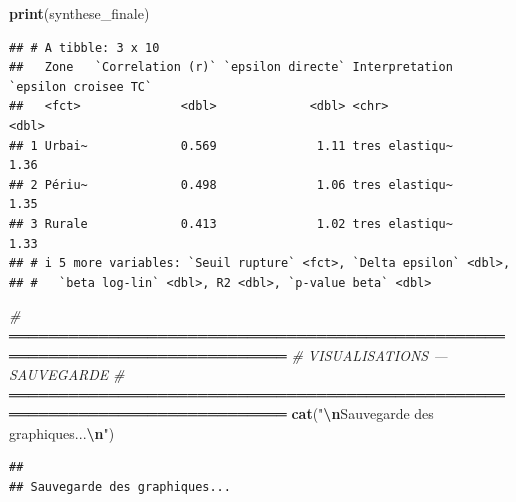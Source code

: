 \documentclass[
]{article}
\newenvironment{Shaded}{\begin{snugshade}}{\end{snugshade}}
\newcommand{\CommentTok}[1]{\textcolor[rgb]{0.56,0.35,0.01}{\textit{#1}}}
\newcommand{\FunctionTok}[1]{\textcolor[rgb]{0.13,0.29,0.53}{\textbf{#1}}}
\newcommand{\NormalTok}[1]{#1}
\newcommand{\SpecialCharTok}[1]{\textcolor[rgb]{0.81,0.36,0.00}{\textbf{#1}}}
\newcommand{\StringTok}[1]{\textcolor[rgb]{0.31,0.60,0.02}{#1}}
\begin{document}
\begin{Shaded}
\begin{Highlighting}[]
\FunctionTok{print}\NormalTok{(synthese\_finale)}
\end{Highlighting}
\end{Shaded}

\begin{verbatim}
## # A tibble: 3 x 10
##   Zone   `Correlation (r)` `epsilon directe` Interpretation `epsilon croisee TC`
##   <fct>              <dbl>             <dbl> <chr>                         <dbl>
## 1 Urbai~             0.569              1.11 tres elastiqu~                 1.36
## 2 Périu~             0.498              1.06 tres elastiqu~                 1.35
## 3 Rurale             0.413              1.02 tres elastiqu~                 1.33
## # i 5 more variables: `Seuil rupture` <fct>, `Delta epsilon` <dbl>,
## #   `beta log-lin` <dbl>, R2 <dbl>, `p-value beta` <dbl>
\end{verbatim}

\begin{Shaded}
\begin{Highlighting}[]
\CommentTok{\# ══════════════════════════════════════════════════════════════════════════════}
\CommentTok{\#  VISUALISATIONS — SAUVEGARDE}
\CommentTok{\# ══════════════════════════════════════════════════════════════════════════════}
\FunctionTok{cat}\NormalTok{(}\StringTok{"}\SpecialCharTok{\textbackslash{}n}\StringTok{Sauvegarde des graphiques...}\SpecialCharTok{\textbackslash{}n}\StringTok{"}\NormalTok{)}
\end{Highlighting}
\end{Shaded}

\begin{verbatim}
## 
## Sauvegarde des graphiques...
\end{verbatim}
\end{document}
